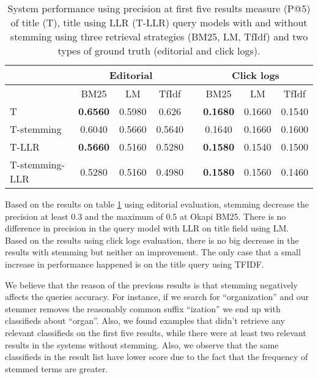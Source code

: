 \begin{table}[H]
\begin{center}
\caption{System performance  using precision at first five results measure (P@5) of title (T), title using LLR (T-LLR) query models with and without stemming using three retrieval strategies (BM25, LM, TfIdf) and two types of ground truth (editorial and click logs).}
\label{table:stemmSystems}
\begin{tabular}{lccccccc}
\toprule
 & \multicolumn{3}{c}{Editorial} & & \multicolumn{3}{c}{Click logs} \\
\midrule
 & BM25 & LM & TfIdf &   & BM25 & LM & TfIdf \\
\midrule
T &  \textbf{0.6560} &  0.5980 & 0.626 &   &            \textbf{0.1680} & 0.1660 & 0.1540 \\
T-stemming 	& 0.6040 & 0.5660 & 0.5640 &   &	 		0.1640 & 0.1660 & 0.1600 \\
T-LLR & \textbf{0.5660} & 0.5160 & 0.5280 &   &	 		\textbf{0.1580} & 0.1540 & 0.1500 \\
T-stemming-LLR & 0.5280 & 0.5160 & 0.4980 &   &	 		\textbf{0.1580} & 0.1560 & 0.1460 \\
\bottomrule
\end{tabular}
\end{center}
\end{table}




Based on the results on table \ref{table:stemmSystems} using editorial evaluation, stemming decrease the precision at least 0.3 and the maximum of 0.5 at Okapi BM25. There is no difference in precision in the query model with LLR on title field using LM.
Based on the results using click logs evaluation, there is no big decrease in the results with stemming but neither an improvement. The only case that a small increase in performance happened is on the title query using TFIDF.

We believe that the reason of the previous results is that stemming negatively affects the queries accuracy. For instance, if we search for ``organization'' and our stemmer removes the reasonably common suffix ``ization'' we end up with classifieds about ``organ''. Also, we found examples that didn't retrieve any relevant classifieds on the first five results, while there were at least two relevant results in the systems without stemming. Also, we observe that the same classifieds in the result list have lower score due to the fact that the frequency of stemmed terms are greater.

